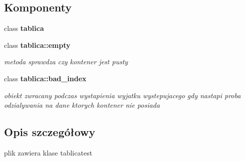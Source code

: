 \subsection*{Komponenty}
\begin{DoxyCompactItemize}
\item 
class {\bf tablica}
\item 
class {\bf tablica\+::empty}
\begin{DoxyCompactList}\small\item\em metoda sprawdza czy kontener jest pusty \end{DoxyCompactList}\item 
class {\bf tablica\+::bad\+\_\+index}
\begin{DoxyCompactList}\small\item\em obiekt zwracany podczas wystapienia wyjatku wystepujacego gdy nastapi proba odzialywania na dane ktorych kontener nie posiada \end{DoxyCompactList}\end{DoxyCompactItemize}


\subsection{Opis szczegółowy}
plik zawiera klase tablicatest 


